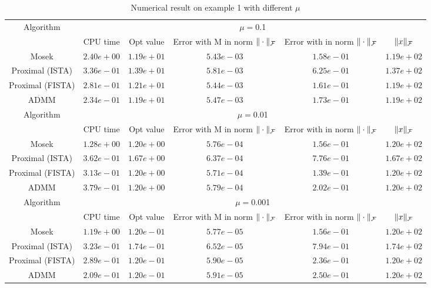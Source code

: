 \documentclass{article}
\begin{document}
\begin{table}
	\centering
	\begin{tabular}{|c|c|c|c|c|c|}
	
	\hline
	\multirow{2}{*}{ Algorithm} &\multicolumn{5}{c|}{$\mu=$0.1}\\\cline{2-6}
	 &CPU time &Opt value &Error with M in norm $\|\cdot\|_\mathcal F$ &Error with in norm $\|\cdot\|_\mathcal F$ &$\|x\|_\mathcal F$\\\hline
	Mosek & $2.40e+00$ & $1.19e+01$ & $5.43e-03$ & $1.58e-01$ & $1.19e+02$\\\hline
	Proximal (ISTA) & $3.36e-01$ & $1.39e+01$ & $5.81e-03$ & $6.25e-01$ & $1.37e+02$\\\hline
	Proximal (FISTA) & $2.81e-01$ & $1.21e+01$ & $5.44e-03$ & $1.61e-01$ & $1.19e+02$\\\hline
	ADMM & $2.34e-01$ & $1.19e+01$ & $5.47e-03$ & $1.73e-01$ & $1.19e+02$\\\hline
	\multirow{2}{*}{ Algorithm} &\multicolumn{5}{c|}{$\mu=$0.01}\\\cline{2-6}
 &CPU time &Opt value &Error with M in norm $\|\cdot\|_\mathcal F$ &Error with in norm $\|\cdot\|_\mathcal F$ &$\|x\|_\mathcal F$\\\hline
	Mosek & $1.28e+00$ & $1.20e+00$ & $5.76e-04$ & $1.56e-01$ & $1.20e+02$\\\hline
	Proximal (ISTA) & $3.62e-01$ & $1.67e+00$ & $6.37e-04$ & $7.76e-01$ & $1.67e+02$\\\hline
	Proximal (FISTA) & $3.13e-01$ & $1.20e+00$ & $5.71e-04$ & $1.39e-01$ & $1.20e+02$\\\hline
	ADMM & $3.79e-01$ & $1.20e+00$ & $5.79e-04$ & $2.02e-01$ & $1.20e+02$\\\hline
	\multirow{2}{*}{ Algorithm} &\multicolumn{5}{c|}{$\mu=$0.001}\\\cline{2-6}
 &CPU time &Opt value &Error with M in norm $\|\cdot\|_\mathcal F$ &Error with in norm $\|\cdot\|_\mathcal F$ &$\|x\|_\mathcal F$\\\hline
Mosek & $1.19e+00$ & $1.20e-01$ & $5.77e-05$ & $1.56e-01$ & $1.20e+02$\\\hline
Proximal (ISTA) & $3.23e-01$ & $1.74e-01$ & $6.52e-05$ & $7.94e-01$ & $1.74e+02$\\\hline
Proximal (FISTA) & $2.89e-01$ & $1.20e-01$ & $5.90e-05$ & $2.36e-01$ & $1.20e+02$\\\hline
ADMM & $2.09e-01$ & $1.20e-01$ & $5.91e-05$ & $2.50e-01$ & $1.20e+02$\\\hline
   \end{tabular}
   \caption{Numerical result on example 1 with different $\mu$\label{example1}}
   \end{table}
   	
\end{document}
